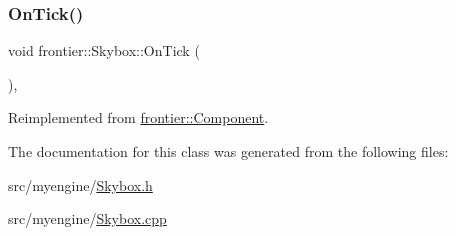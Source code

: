 \mbox{\label{classfrontier_1_1_skybox_a38b2ec1a28314c901f4388745d8f0471}} 
\subsubsection{\texorpdfstring{On\+Tick()}{OnTick()}}
{\footnotesize\ttfamily void frontier\+::\+Skybox\+::\+On\+Tick (\begin{DoxyParamCaption}{ }\end{DoxyParamCaption})\hspace{0.3cm}{\ttfamily [override]}, {\ttfamily [virtual]}}



Reimplemented from \hyperlink{classfrontier_1_1_component_ab920f9bc07ce051ebb5559c5a66508d1}{frontier\+::\+Component}.



The documentation for this class was generated from the following files\+:\begin{DoxyCompactItemize}
\item 
src/myengine/\hyperlink{_skybox_8h}{Skybox.\+h}\item 
src/myengine/\hyperlink{_skybox_8cpp}{Skybox.\+cpp}\end{DoxyCompactItemize}
